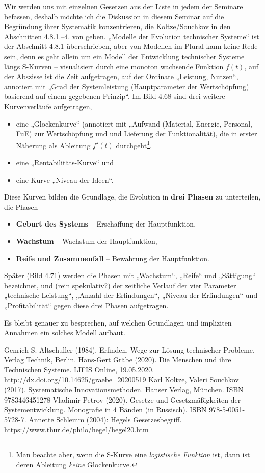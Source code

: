 \documentclass[11pt,a4paper]{article}
\begin{document}
Wir werden uns mit einzelnen Gesetzen aus der Liste in jedem der Seminare
befassen, deshalb möchte ich die Diskussion in diesem Seminar auf die
Begründung ihrer Systematik konzentrieren, die Koltze/Souchkov in den
Abschnitten 4.8.1.--4. von \cite{Koltze2017} geben. „Modelle der Evolution
technischer Systeme“ ist der Abschnitt 4.8.1 überschrieben, aber von Modellen
im Plural kann keine Rede sein, denn es geht allein um ein Modell der
Entwicklung technischer Systeme längs S-Kurven -- visualisiert durch eine
monoton wachsende Funktion $f(t)$, auf der Abszisse ist die Zeit aufgetragen,
auf der Ordinate „Leistung, Nutzen“, annotiert mit „Grad der Systemleistung
(Hauptparameter der Wertschöpfung) basierend auf einem gegebenen Prinzip“. Im
Bild 4.68 sind drei weitere Kurvenverläufe aufgetragen,
\begin{itemize}[noitemsep]
\item eine „Glockenkurve“ (annotiert mit „Aufwand (Material, Energie,
  Personal, FuE) zur Wertschöpfung und und Lieferung der Funktionalität), die
  in erster Näherung als Ableitung $f'(t)$ durchgeht\footnote{Man beachte
    aber, wenn die S-Kurve eine \emph{logistische Funktion} ist, dann ist
    deren Ableitung \emph{keine} Glockenkurve.}, 
\item eine „Rentabilitäts-Kurve“ und 
\item eine Kurve „Niveau der Ideen“. 
\end{itemize}
Diese Kurven bilden die Grundlage, die Evolution in \textbf{drei Phasen} zu
unterteilen, die Phasen
\begin{itemize}[noitemsep]
\item \textbf{Geburt des Systems} -- Erschaffung der Hauptfunktion,
\item \textbf{Wachstum} -- Wachstum der Hauptfunktion,
\item \textbf{Reife und Zusammenfall} -- Bewahrung der Hauptfunktion. 
\end{itemize}
Später (Bild 4.71) werden die Phasen mit „Wachstum“, „Reife“ und „Sättigung“
bezeichnet, und (rein spekulativ?) der zeitliche Verlauf der vier Parameter
„technische Leistung“, „Anzahl der Erfindungen“, „Niveau der Erfindungen“ und
„Profitabilität“ gegen diese drei Phasen aufgetragen. 

Es bleibt genauer zu besprechen, auf welchen Grundlagen und impliziten
Annahmen ein solches Modell aufbaut.

\begin{thebibliography}{xxx}
 Genrich S. Altschuller (1984).  Erfinden. Wege zur
  Lösung technischer Probleme. Verlag Technik, Berlin. 
 Hans-Gert Gräbe (2020). Die Menschen und ihre Technischen
  Systeme. LIFIS Online, 19.05.2020.
  \url{http://dx.doi.org/10.14625/graebe_20200519}
 Karl Koltze, Valeri Souchkov (2017). Systematische
  Innovationsmethoden.  Hanser Verlag, München. ISBN 9783446451278
 Vladimir Petrov (2020). Gesetze und Gesetzmäßigkeiten
  der Systementwicklung. Monografie in 4 Bänden (in Russisch). ISBN
  978-5-0051-5728-7.
 Annette Schlemm (2004): Hegels Gesetzesbegriff.\\
  \url{https://www.thur.de/philo/hegel/hegel20.htm}
\end{thebibliography}
\end{document}
